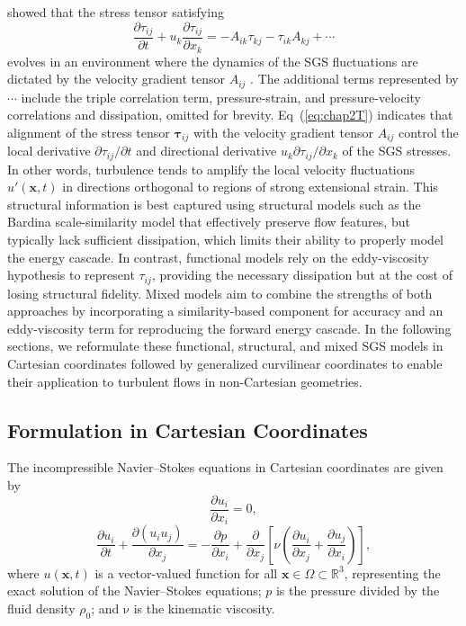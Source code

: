 \documentclass[final,3p]{elsarticle}
\begin{document}
\citet{deardorff1974} showed that the stress tensor satisfying
\begin{equation}
	\label{eq:chap2T}
	\frac{\partial\mathcal\tau_{ij}}{\partial t} + u_k\frac{\partial\mathcal\tau_{ij}}{\partial x_k} = - A_{ik}\mathcal\tau_{kj} - \mathcal\tau_{ik} A_{kj} + \cdots
\end{equation}
%
evolves in an environment where the dynamics of the SGS fluctuations are dictated by the velocity gradient tensor $A_{ij}$ \cite{leonard1974, germano1991dynamic}. The additional terms represented by $\cdots$ include the triple correlation term, pressure-strain, and pressure-velocity correlations and dissipation, omitted for brevity. Eq~(\ref{eq:chap2T}) indicates that alignment of the stress tensor $\bm{\tau}_{ij}$ with the velocity gradient tensor $A_{ij}$ control the local derivative $\partial \tau_{ij}/\partial t$ and directional derivative $u_{k}\partial \tau_{ij}/\partial x_{k}$ of the SGS stresses. In other words, turbulence tends to amplify the local velocity fluctuations \( u'(\bm{x}, t) \) in directions orthogonal to regions of strong extensional strain. This structural information is best captured using structural models such as the Bardina scale-similarity model \cite{bardina1980improved} that effectively preserve flow features, but typically lack sufficient dissipation, which limits their ability to properly model the energy cascade. In contrast, functional models rely on the eddy-viscosity hypothesis to represent \( \tau_{ij} \), providing the necessary dissipation but at the cost of losing structural fidelity. Mixed models aim to combine the strengths of both approaches by incorporating a similarity-based component for accuracy and an eddy-viscosity term for reproducing the forward energy cascade. In the following sections, we reformulate these functional, structural, and mixed SGS models in Cartesian coordinates followed by generalized curvilinear coordinates to enable their application to turbulent flows in non-Cartesian geometries.

\subsection{Formulation in Cartesian Coordinates}
The incompressible Navier--Stokes equations in Cartesian coordinates are given by
\begin{equation}
	\frac{\partial u_{i}}{\partial x_i} = 0,
	\label{eq:nseC}
\end{equation}
%
\begin{equation}
	\frac{\partial u_i}{\partial t} + \frac{\partial \left(u_{i}u_{j}\right)}{\partial x_j} = -\frac{\partial p}{\partial x_i} + \frac{\partial }{\partial x_j}\left[\nu\left(\frac{\partial u_i}{\partial x_j} + \frac{\partial u_j}{\partial x_i}\right)\right],
	\label{eq:nseM}
\end{equation}
%
where ${u}(\bm{x}, t)$ is a vector-valued function for all $\bm{x} \in \Omega \subset \mathbb{R}^3$, representing the exact solution of the Navier--Stokes equations; $p$ is the pressure divided by the fluid density $\rho_0$; and $\mathrm{\nu}$ is the kinematic viscosity. 
\end{document}
